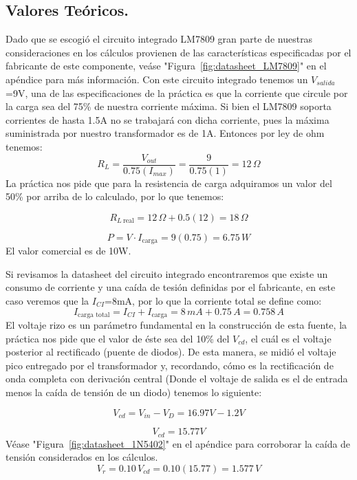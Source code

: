 \documentclass[journal]{IEEEtran}
\begin{document}
    \subsection{Valores Teóricos.}  

    Dado que se escogió el circuito integrado LM7809 gran parte de nuestras consideraciones en los cálculos provienen de las características especificadas por el fabricante de 
    este componente, veáse "Figura~\ref{fig:datasheet_LM7809}" en el apéndice para más información.
    Con este circuito integrado tenemos un $V_{salida}$=9V, una de las especificaciones de la práctica es que la corriente que circule por la carga sea del 75\% de nuestra corriente máxima. Si bien el LM7809 soporta corrientes de
    hasta 1.5A no se trabajará con dicha corriente, pues la máxima suministrada por nuestro transformador es de 1A. Entonces por ley de ohm tenemos:
        \[
        R_L = \frac{V_{out}}{0.75(I_{max})} = \frac{9}{0.75(1)} = 12\,\Omega
        \]
    La práctica nos pide que para la resistencia de carga adquiramos un valor del 50\% por arriba de lo calculado, por lo que tenemos:

        \[
        R_{L\ \text{real}} = 12\,\Omega + 0.5(12) = 18\,\Omega
        \]

        \[
        P = V \cdot I_{\text{carga}} = 9(0.75) = 6.75\,W
        \]
    El valor comercial es de 10W.

    Si revisamos la datasheet del circuito integrado encontraremos que existe un consumo de corriente y una caída de tesión definidas por el fabricante, en este caso veremos que la $I_{CI}$=8mA, por lo que la corriente total se define como:
        \[
        I_{\text{carga total}} = I_{CI} + I_{\text{carga}} = 8\,mA + 0.75\,A = 0.758\,A
        \]
    El voltaje rizo es un parámetro fundamental en la construcción de esta fuente, la práctica nos pide que el valor de éste sea del 10\% del $V_{cd}$, el cuál es el voltaje posterior al rectificado (puente de diodos).
    De esta manera, se midió el voltaje pico entregado por el transformador y, recordando, cómo es la rectificación de onda completa con derivación central (Donde el voltaje de salida es el de entrada menos la caída de tensión de un diodo) tenemos lo
    siguiente:

        \[
        V_{cd} = V_{in} - V_D = 16.97V -1.2V
        \]

        \[
        V_{cd} = 15.77V
        \]
        Véase "Figura~\ref{fig:datasheet_1N5402}" en el apéndice para corroborar la caída de tensión considerados en los cálculos.
        \[
        V_r = 0.10\,V_{cd} = 0.10(15.77) = 1.577\,V
        \]
\end{document}
